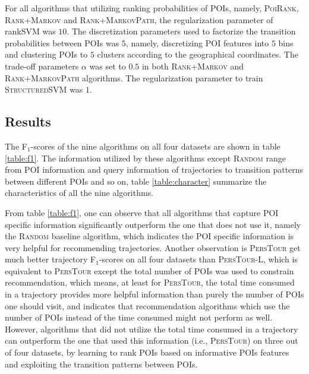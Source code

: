 For all algorithms that utilizing ranking probabilities of POIs, namely, \textsc{PoiRank}, \textsc{Rank+Markov} and 
\textsc{Rank+MarkovPath}, the regularization parameter of rankSVM was $10$.
The discretization parameters used to factorize the transition probabilities between POIs was $5$, namely,
discretizing POI features into $5$ bins and clustering POIs to $5$ clusters according to the geographical coordinates.
The trade-off parameters $\alpha$ was set to $0.5$ in both \textsc{Rank+Markov} and \textsc{Rank+MarkovPath} algorithms.
The regularization parameter to train \textsc{StructuredSVM} was $1$.


\subsection{Results}
The F$_1$-scores of the nine algorithms on all four datasets are shown in table \ref{table:f1}.
The information utilized by these algorithms except \textsc{Random} range from POI information and query information 
of trajectories to transition patterns between different POIs and so on, table \ref{table:character} summarize the 
characteristics of all the nine algorithms.

From table \ref{table:f1}, one can observe that all algorithms that capture POI specific information significantly 
outperform the one that does not use it, namely the \textsc{Random} baseline algorithm, 
which indicates the POI specific information is very helpful for recommending trajectories.
%
Another observation is \textsc{PersTour} get much better trajectory F$_1$-scores on all four datasets 
than \textsc{PersTour-L}, which is equivalent to \textsc{PersTour} except the total number of POIs was used to 
constrain recommendation, which means, at least for \textsc{PersTour}, the total time consumed in a trajectory
provides more helpful information than purely the number of POIs one should visit, and indicates that recommendation
algorithms which use the number of POIs instead of the time consumed might not perform as well.
%
However, algorithms that did not utilize the total time consumed in a trajectory can outperform the one that 
used this information (i.e., \textsc{PersTour}) on three out of four datasets, 
by learning to rank POIs based on informative POIs features and exploiting the transition patterns between POIs.

